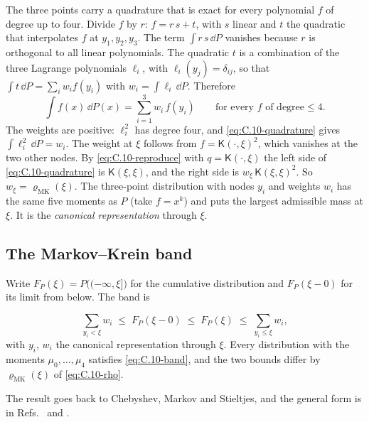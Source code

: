 The three points carry a quadrature that is exact for every polynomial $f$ of degree up to four. Divide $f$ by $r$: $f = r\,s + t$, with $s$ linear and $t$ the quadratic that interpolates $f$ at $y_1, y_2, y_3$. The term $\int r\,s\,\dd P$ vanishes because $r$ is orthogonal to all linear polynomials. The quadratic $t$ is a combination of the three Lagrange polynomials $\ell_i$, with $\ell_i(y_j) = \delta_{ij}$, so that $\int t\,\dd P = \sum_i w_i f(y_i)$ with $w_i = \int\ell_i\,\dd P$. Therefore
\begin{equation}
  \int f(x)\,\dd P(x) = \sum_{i=1}^{3} w_i\,f(y_i) \qquad \text{for every } f \text{ of degree} \le 4 .
  \label{eq:C.10-quadrature}
\end{equation}
The weights are positive: $\ell_i^2$ has degree four, and \cref{eq:C.10-quadrature} gives $\int\ell_i^2\,\dd P = w_i$. The weight at $\xi$ follows from $f = \mathsf{K}(\cdot,\xi)^2$, which vanishes at the two other nodes. By \cref{eq:C.10-reproduce} with $q = \mathsf{K}(\cdot,\xi)$ the left side of \cref{eq:C.10-quadrature} is $\mathsf{K}(\xi,\xi)$, and the right side is $w_\xi\,\mathsf{K}(\xi,\xi)^2$. So $w_\xi = \varrho_{\mathrm{MK}}(\xi)$. The three-point distribution with nodes $y_i$ and weights $w_i$ has the same five moments as $P$ (take $f = x^k$) and puts the largest admissible mass at $\xi$. It is the \emph{canonical representation} through $\xi$.

\subsection{The Markov--Krein band}

Write $F_P(\xi) = P\bigl((-\infty, \xi]\bigr)$ for the cumulative distribution and $F_P(\xi - 0)$ for its limit from below. The band is
\begin{keyresult}
\begin{equation}
  \sum_{y_i < \xi} w_i \;\le\; F_P(\xi - 0) \;\le\; F_P(\xi) \;\le\; \sum_{y_i \le \xi} w_i ,
  \label{eq:C.10-band}
\end{equation}
with $y_i$, $w_i$ the canonical representation through $\xi$. Every distribution with the moments $\mu_0, \dots, \mu_4$ satisfies \cref{eq:C.10-band}, and the two bounds differ by $\varrho_{\mathrm{MK}}(\xi)$ of \cref{eq:C.10-rho}.
\end{keyresult}
The result goes back to Chebyshev, Markov and Stieltjes, and the general form is in Refs.~\cite{krein1977markov} and \cite{akhiezer1965classical}.

